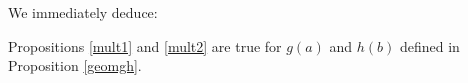 We immediately deduce:  
\begin{corollary} 
Propositions \ref{mult1} and \ref{mult2} are true for $g(a)$ and $h(b)$ defined in Proposition \ref{geomgh}.
\end{corollary}   
   
   
\begin{comment}

\section{The $\CC^*$-fixed locus} \label{fixedlocus}

The action of $\CC^*$ on the fibres of $X$ lifts to the moduli space
$\Hilb^{d,\bullet}(X)$. Therefore
$$
\int_{\Hilb^{d,\bullet}(X)} 1 \, de = \int_{\Hilb^{d,\bullet}(X)^{\CC^*}} 1 \, de.
$$

In order to understand $\Hilb^{d,n}(X)$, we first study
$Z_{\CM}\subset Z$, the maximal Cohen-Macaulay subscheme of any
$\CC^{*}$-invariant subschemes $Z\subset X$. We find that such
subschemes are determined by a point in $\Sym^{d}(B)$ along with some
discrete data (a collection of integer partitions). This is given by
the following two propositions and is illustrated in Figure~\ref{fig: drawing of Cohen-Macaulay C^* fixed subscheme}.



\begin{figure}
\begin{tikzpicture}[
                    z  = {-15},
		    scale = 1]

\begin{scope}[yslant=-0.35,xslant=0]
  



\begin{scope} [canvas is yz plane at x=0]
\draw [black](0,0) rectangle (3,5);
\end{scope}
\begin{scope} [canvas is xz plane at y=0]
\draw [black](0,0) rectangle (4,5);
\end{scope}
\begin{scope} [canvas is xz plane at y=0.5]
\draw [black](0,0) rectangle (4,5);
\end{scope}
\draw [black](0,0) rectangle (4,3);



\end{comment}
